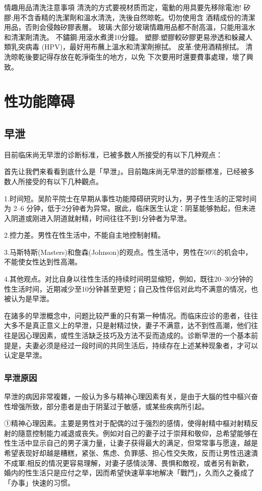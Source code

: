 \documentclass[12pt,UTF8]{ctexbook}
\begin{document}
情趣用品清洗注意事項
清洗的方式要視材质而定，電動的用具要先移除電池!
矽膠:用不含香精的洗潔劑和溫水清洗，洗後自然晾乾。切勿使用含
酒精成份的清潔用品，否則会侵蝕矽膠表層。
玻璃:大部分玻璃情趣用品都不耐高溫，只能用溫水和清潔劑清洗。
不鏽鋼:用滾水煮燙10分鐘。
塑膠:塑膠較矽膠更易滲透和躲藏人類乳突病毒
(HPV)，最好用布蘸上溫水和清潔劑擦拭。
皮革:使用酒精擦拭。
清洗晾乾後要記得存放在乾淨衛生的地方，以免
下次要用时還要費事處理，壞了興致。

\part{性功能障碍}

\chapter{早泄}

目前临床尚无早泄的诊断标准，已被多数人所接受的有以下几种观点：

首先让我們来看看到底什么是「早泄」。目前臨床尚无早泄的診斷標准，已经被多数人所接受的有以下几种觀点。

1.时间短。吴阶平院士在早期从事性功能障碍研究时认为，男子性生活的正常时间为 2--6 分钟，低于2分钟者为异常。据此，临床医生认定：阴茎能够勃起，但未进入阴道或刚进入阴道就射精，时间往往不到1分钟者为早泄。

2.控力差。男性在性生活中，不能自主地控制射精。

3.马斯特斯(Masters)和詹森(Johnson)的观点。性生活中，男性在50\%的机会中，不能使女性达到性高潮。

4.其他观点。对比自身以往性生活的持续时间明显缩短，例如，既往20--30分钟的性生活时间，近期减少至10分钟甚至更短；自己及性伴侣对此均不满意的情况，也被认为是早泄。

在諸多的早泄概念中，问题比较严重的只有第一种情况。而临床应诊的患者，往往大多不是真正意义上的早泄，只是射精过快，妻子不满意，达不到性高潮，他们往往是因心理因素，或性生活缺乏技巧及方法不妥而造成的。诊断早泄的一个基本前提是，夫妻必须是经过一段时间的共同生活后，持续存在上述某种现象者，才可以认定是早泄。

\section{早泄原因}

早泄的病因非常複雜，一般认为多与精神心理因素有关，是由于大腦的性中樞兴奋性增强所致，部分患者是由于阴茎过于敏感，或某些疾病所引起。

①精神心理因素。主要是男性对于配偶的过于强烈的感情，使得射精中樞对射精反射的隨意控制能力减退或丧失。例如对自己的妻子过于崇拜和敬仰，总希望能够在性生活中显示自己的男子漢力量，让妻子获得最大的满足，但常常事与愿違，越是希望表现好却越是糟糕，紧张、焦虑、负罪感、担心性交失敗，反而让男性迅速潰不成軍;相反的情况更容易理解，对妻子感情淡薄、畏惧和敵视，或者另有新歡，婚内的性生活只是应付之举，因而希望快速草率地解决「戰鬥」，久而久之養成了「办事」快速的习惯。
\end{document}
